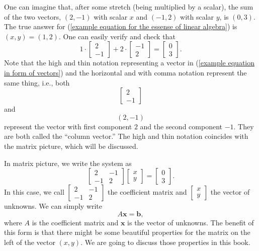 \documentclass[11pt]{article}
\theoremstyle{break}
\theoremstyle{no_label}
\newcommand{\bfb}{\textbf{b}}
\newcommand{\bfx}{\textbf{x}}
\numberwithin{equation}{section}
\begin{document}
One can imagine that, after some stretch (being multiplied by a scalar), the sum of the two vectors, $(2, -1)$ with scalar $x$ and $(-1, 2)$ with scalar $y$, is $(0, 3)$. The true answer for (\ref{example equation for the essense of linear algebra}) is $(x, y)=(1, 2)$. One can easily verify and check that 
\begin{equation*}
    1\cdot\begin{bmatrix}
        2 \\ -1
    \end{bmatrix}+2\cdot\begin{bmatrix}
        -1 \\ 2
    \end{bmatrix}=\begin{bmatrix}
        0 \\ 3
    \end{bmatrix}.
\end{equation*}
Note that the high and thin notation representing a vector in (\ref{example equation in form of vectors}) and the horizontal and with comma notation represent the same thing, i.e., both \begin{equation*}
    \begin{bmatrix}
        2 \\ -1
    \end{bmatrix}
\end{equation*}
and
\begin{equation*}
    (2, -1)
\end{equation*}
represent the vector with first component $2$ and the second component $-1$. They are both called the ``column vector.'' The high and thin notation coincides with the matrix picture, which will be discussed.

In matrix picture, we write the system as
\begin{equation}\label{example equation in form of matrix}
    \begin{bmatrix}
        2 & -1 \\ -1 & 2
    \end{bmatrix}\begin{bmatrix}
        x \\ y
    \end{bmatrix}=\begin{bmatrix}
        0 \\ 3
    \end{bmatrix}.
\end{equation}
In this case, we call $\begin{bmatrix}
    2 & -1 \\ -1 & 2
\end{bmatrix}$ the coefficient matrix and $\begin{bmatrix}
    x \\ y
\end{bmatrix}$ the vector of unknowns. We can simply write \begin{equation*}
    A\bfx=\bfb,
\end{equation*}
where $A$ is the coefficient matrix and $\bfx$ is the vector of unknowns. The benefit of this form is that there might be some beautiful properties for the matrix on the left of the vector $(x, y)$. We are going to discuss those properties in this book.
\end{document}
